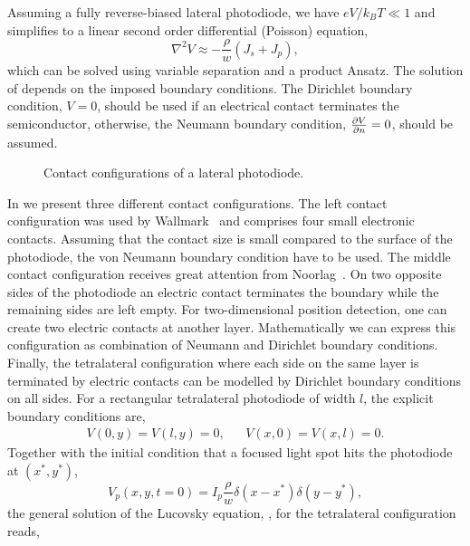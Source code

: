 Assuming a fully reverse-biased lateral photodiode, we have $eV/k_BT\ll1$ and  simplifies to a linear second order differential (Poisson) equation,
\begin{equation}
	\nabla^2V\approx-\frac{\rho}{w}\left(J_s+J_p\right)
	\label{eq:lucovsky_reverse_bias},
\end{equation}
which can be solved using variable separation and a product Ansatz.
The solution of  depends on the imposed boundary conditions.
The Dirichlet boundary condition, $V=0$, should be used if an electrical contact terminates the semiconductor, otherwise, the Neumann boundary condition, $\pdv{V}{n}=0$, should be assumed.
\begin{figure}[H]
	\centering
	
	\caption{Contact configurations of a lateral photodiode.}\label{fig:lateral_photodiode_contacts}
\end{figure}
In  we present three different contact configurations.
The left contact configuration was used by Wallmark~\cite{Wallmark57} and comprises four small electronic contacts.
Assuming that the contact size is small compared to the surface of the photodiode, the von Neumann boundary condition have to be used.
The middle contact configuration receives great attention from Noorlag~\cite{Noorlag74}.
On two opposite sides of the photodiode an electric contact terminates the boundary while the remaining sides are left empty.
For two-dimensional position detection, one can create two electric contacts at another layer.
Mathematically we can express this configuration as combination of Neumann and Dirichlet boundary conditions.
Finally, the tetralateral configuration where each side on the same layer is terminated by electric contacts can be modelled by Dirichlet boundary conditions on all sides.
For a rectangular tetralateral photodiode of width $l$, the explicit boundary conditions are,
\begin{align}
	V(0, y)=V(l,y)=0, && V(x,0)=V(x,l)=0.
\end{align}
Together with the initial condition that a focused light spot hits the photodiode at $(x^*,y^*)$,
\begin{equation}
	V_p(x,y, t=0)=I_p\frac{\rho}{w}\delta(x-x^*)\delta(y-y^*)
	\label{eq:lucovsky_initial},
\end{equation}
the general solution of the Lucovsky equation, , for the tetralateral configuration reads,

